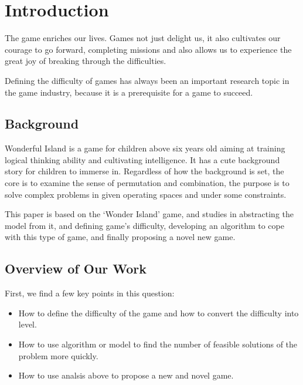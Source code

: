 \documentclass{mcmthesis}
\begin{document}
	\maketitle
	\setcounter{tocdepth}{2}
	\tableofcontents
	
	\newpage
	\section{Introduction}
		
		The game enriches our lives. Games not just delight us, it also cultivates our courage to go forward, completing missions and also allows us to experience the great joy of breaking through the difficulties.
		
		Defining the difficulty of games has always been an important research topic in the game industry, because it is a prerequisite for a game to succeed.
		
		
		
		\subsection{Background}
		
			Wonderful Island is a game for children above six years old aiming at training logical thinking ability and cultivating intelligence. It has a cute background story for children to immerse in. Regardless of how the background is set, the core is to examine the sense of permutation and combination, the purpose is to solve complex problems in given operating spaces and under some constraints.
			
			This paper is based on the ‘Wonder Island’ game, and
			studies in abstracting the model from it, and defining game’s difficulty, developing an algorithm to cope with this type of game, and finally proposing a novel new game.
		
			
		\subsection{Overview of Our Work}
		
			First, we find a few key points in this question:
					
			\begin{itemize}
				\item How to define the difficulty of the game and how to convert the difficulty into level.
				
				\item How to use algorithm or model to find the number of feasible solutions of the problem more quickly.
				
				\item How to use analsis above to propose a new and novel game.
			\end{itemize}
			
\end{document}
